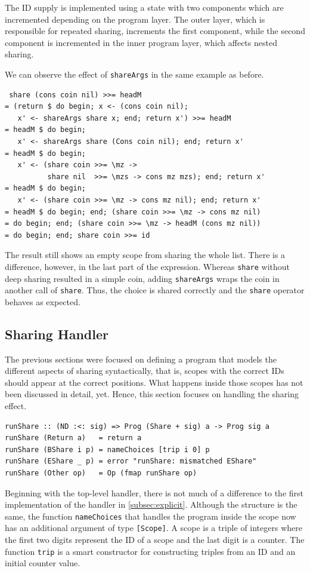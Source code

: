 \documentclass[a4paper, 11pt, fleqn, twoside]{scrreprt}
\newcommand{\hinl}[1]{\texttt{#1}}
\begin{document}
The ID supply is implemented using a state with two components which are incremented depending on the program layer.
The outer layer, which is responsible for repeated sharing, increments the first component, while the second component is incremented in the inner program layer, which affects nested sharing.

We can observe the effect of \hinl{shareArgs} in the same example as before.

\begin{verbatim}
 share (cons coin nil) >>= headM
= (return $ do begin; x <- (cons coin nil); 
   x' <- shareArgs share x; end; return x') >>= headM
= headM $ do begin; 
   x' <- shareArgs share (Cons coin nil); end; return x'
= headM $ do begin; 
   x' <- (share coin >>= \mz -> 
          share nil  >>= \mzs -> cons mz mzs); end; return x'
= headM $ do begin; 
   x' <- (share coin >>= \mz -> cons mz nil); end; return x'
= headM $ do begin; end; (share coin >>= \mz -> cons mz nil)
= do begin; end; (share coin >>= \mz -> headM (cons mz nil))
= do begin; end; share coin >>= id
\end{verbatim}

The result still shows an empty scope from sharing the whole list.
There is a difference, however, in the last part of the expression.
Whereas \hinl{share} without deep sharing resulted in a simple coin, adding \hinl{shareArgs} wraps the coin in another call of \hinl{share}.
Thus, the choice is shared correctly and the \hinl{share} operator behaves as expected.

\subsection{Sharing Handler}
The previous sections were focused on defining a program that models the different aspects of sharing syntactically, that is, scopes with the correct IDs should appear at the correct positions.
What happens inside those scopes has not been discussed in detail, yet.
Hence, this section focuses on handling the sharing effect.

\begin{verbatim}
runShare :: (ND :<: sig) => Prog (Share + sig) a -> Prog sig a
runShare (Return a)   = return a
runShare (BShare i p) = nameChoices [trip i 0] p
runShare (EShare _ p) = error "runShare: mismatched EShare"
runShare (Other op)   = Op (fmap runShare op)
\end{verbatim}

Beginning with the top-level handler, there is not much of a difference to the first implementation of the handler in \autoref{subsec:explicit}.
Although the structure is the same, the function \hinl{nameChoices} that handles the program inside the scope now has an additional argument of type \hinl{[Scope]}.
A scope is a triple of integers where the first two digits represent the ID of a scope and the last digit is a counter.
The function \hinl{trip} is a smart constructor for constructing triples from an ID and an initial counter value.
\end{document}
